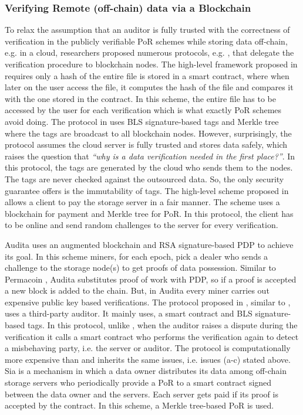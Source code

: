  \subsubsection{Verifying Remote (off-chain) data via a Blockchain}
 To relax the assumption that an auditor is fully trusted with the correctness of verification in the publicly verifiable PoR schemes while storing data off-chain, e.g. in a cloud, researchers proposed numerous protocols, e.g. \cite{RennerMK18,HaoXWJW18,ZhangDLZ18,Audita18,blockchain-data-audit-18,sia14}, that delegate the verification procedure  to blockchain nodes.  The high-level framework  proposed in \cite{RennerMK18} requires only a hash of the entire file is stored in a smart contract, where when later on the user access the file, it computes the hash of the file and compares it with the one stored in the contract. In this scheme, the entire file has to be accessed by the user for each verification which is what exactly PoR schemes avoid doing. The protocol  in \cite{HaoXWJW18} uses BLS signature-based tags and Merkle tree where the tags are broadcast to all blockchain nodes. However, surprisingly, the protocol assumes the cloud server is fully trusted and stores data safely, which raises the question that \textit{``why is a data verification needed in the first place?''}. In this protocol, the tags are generated by the cloud who sends them to the nodes. The tags are never checked against the outsourced data.  So, the only security guarantee \cite{HaoXWJW18} offers is the immutability of tags. The high-level scheme proposed in \cite{ZhangDLZ18} allows a client to pay the storage server in a fair manner. The scheme uses a blockchain for payment    and Merkle tree for PoR. In this protocol, the client has to be online and send random challenges to the server for every verification. 
 
 Audita  \cite{Audita18} uses an augmented blockchain and RSA signature-based  PDP  \cite{DBLP:conf/ccs/AtenieseBCHKPS07} to achieve its goal. In this scheme miners, for each epoch, pick a dealer who sends a challenge to the storage node(s) to get  proofs of data possession. Similar to Permacoin \cite{MillerPermacoin}, Audita substitutes proof of work with PDP, so if a proof is accepted a new block is added to the chain. But, in Audita every miner carries out  expensive public key based verifications.  The protocol proposed in \cite{blockchain-data-audit-18},   similar to \cite{armknecht2014outsourced}, uses a third-party auditor. It mainly uses, a smart contract and  BLS signature-based tags. In this protocol, unlike \cite{armknecht2014outsourced},  when the auditor raises a dispute during the verification it calls a smart contract who performs the verification again to detect a misbehaving party, i.e. the server or auditor.  The protocol is computationally more expensive than \cite{armknecht2014outsourced} and inherits the same  issues, i.e. issues (a-c) stated above.  Sia \cite{sia14} is a mechanism in which a data owner  distributes  its data among off-chain storage servers who periodically provide a PoR  to a smart contract signed between the data owner and the servers. Each server gets paid if its proof is accepted by the contract. In this scheme, a Merkle tree-based PoR is used. 
 

